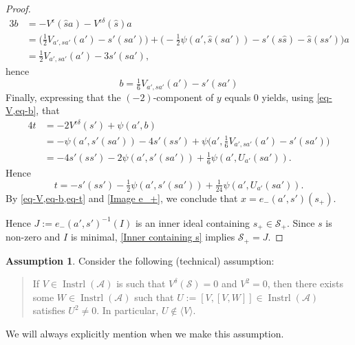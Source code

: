 \documentclass[oneside,a4paper]{amsart} %
\theoremstyle{definition}
\newtheorem{assumption}[theorem]{Assumption}
\DeclareMathOperator{\Inst}{Instrl}
\newcommand{\A}{\mathcal{A}}
\renewcommand{\SS}{\mathcal{S}}
\numberwithin{equation}{section}
\begin{document}
\begin{proof}
	\begin{align*}  
		3b &= -V^\epsilon(\hat sa)-V^{\epsilon\delta}(\hat s)a \\
		  &= \bigl( \tfrac{1}{2} V_{a',sa'}(a')-s'(sa') \bigr) + \bigl( -\tfrac{1}{2} \psi(a',\hat s(sa'))-s'(s\hat s)-\hat s(ss') \bigr) a \\
		  &= \tfrac{1}{2} V_{a',sa'}(a')-3s'(sa'),
	\end{align*}
	hence
	\begin{equation}\label{eq-b}
	    b = \tfrac{1}{6} V_{a',sa'}(a') - s'(sa')
	\end{equation}
	Finally, expressing that the $(-2)$-component of $y$ equals $0$ yields, using \cref{eq-V,eq-b}, that
	\begin{align*}
		4t &= -2V^{\epsilon\delta}(s') + \psi (a',b) \\
		  &= -\psi(a',s'(sa'))-4s'(ss') + \psi \bigl(a',\tfrac{1}{6} V_{a',sa'}(a')-s'(sa')\bigr) \\
		  &= -4s'(ss')-2\psi (a',s'(sa')) + \tfrac{1}{6} \psi (a',U_{a'}(sa')).
	\end{align*}
	Hence
	\begin{equation}\label{eq-t}
	   t = -s'(ss')-\tfrac{1}{2} \psi (a',s'(sa')) + \tfrac{1}{24} \psi (a',U_{a'}(sa')) .
	\end{equation}
	By \cref{eq-V,eq-b,eq-t} and \cref{Image e_+}, we conclude that $x= e_-(a',s')(s_+)$. 
	
	Hence $J:=e_-(a',s')^{-1}(I)$ is an inner ideal containing $s_+\in\SS_+$.
	Since $s$ is non-zero and $I$ is minimal, \cref{Inner containing s} implies $\SS_+ =J$.
\end{proof}

\begin{assumption}
\label{ass:V0} 
Consider the following (technical) assumption:
\begin{quote}    
	If $V\in\Inst(\A)$ is such that $V^\delta(\SS)=0$ and $V^2=0$, then there exists some
	$W\in \Inst(\A)$ such that $U:=[V,[V,W]] \in\Inst(\A)$ satisfies $U^2\neq 0$. In particular, $U\not\in\langle V\rangle$.
\end{quote}
We will always explicitly mention when we make this assumption.
\end{assumption}
\end{document}
